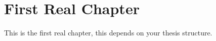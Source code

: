 \chapter{First Real Chapter}\label{chapter:first_real_chapter}

This is the first real chapter, this depends on your thesis structure. 